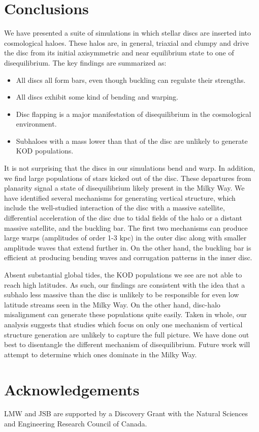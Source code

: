 \section{Conclusions}\label{sec:conclusion}
{We have presented a suite of simulations in which stellar discs are
inserted into cosmological haloes. These halos are, in general,
triaxial and clumpy and drive the disc from its initial axisymmetric
and near equilibrium state to one of disequilibrium. The key findings are summarized as:
\begin{itemize}
\item All discs all form bars, even though buckling can regulate their strengths.
\item All discs exhibit some kind of bending and warping.
\item Disc flapping is a major manifestation of disequilibrium in the cosmological environment.
\item Subhaloes with a mass lower than that of the disc are unlikely to generate KOD populations.
\end{itemize}}
{It is not surprising that} the discs in our simulations bend and warp. In
addition, we find large populations of stars kicked out of the disc.
These departures from planarity signal a state of disequilibrium {likely present in the Milky Way}.  We
have identified several mechanisms for generating vertical structure, which
include the well-studied interaction of the disc with a massive
satellite, differential acceleration of the disc due to tidal fields
of the halo or a distant massive satellite, and the buckling bar.
The first two mechanisms can produce large warps (amplitudes of
order 1-3 kpc) in the outer disc along with smaller amplitude 
waves that extend further in. On the other hand, the buckling bar
is efficient at producing bending waves and corrugation patterns 
in the inner disc.

{Absent substantial global tides, the KOD populations we see are not able to reach high latitudes. As such, o}ur findings are consistent with the idea that a subhalo less
massive than the disc is unlikely to be responsible for even low
latitude streams seen in the Milky Way. On the other hand, disc-halo
misalignment can generate these populations quite easily. {Taken in whole, our analysis suggests that studies which focus on only one mechanism of vertical structure generation are unlikely to capture the full picture. We have done out best to disentangle the different mechanism of disequilibrium. Future work will attempt to determine which ones dominate in the Milky Way.}

\section*{Acknowledgements}
{LMW and JSB are supported by a Discovery Grant with the Natural
  Sciences and Engineering Research Council of Canada.}
  
  





